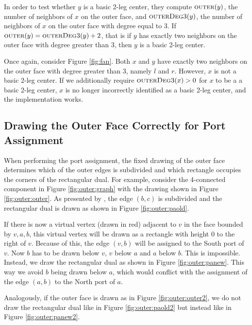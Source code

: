 \documentclass[a4paper]{article}
\begin{document}
In order to test whether $y$ is a basic 2-leg center, they compute
$\textsc{outer}(y)$, the number of neighbors of $x$ on the outer face, and
$\textsc{outerDeg3}(y)$, the number of neighbors of $x$ on the outer face with
degree equal to $3$.
If $\textsc{outer}(y) = \textsc{outerDeg3}(y) + 2$, that is if $y$ has exactly
two neighbors on the outer face with degree greater than $3$, then $y$ is a
basic 2-leg center.

Once again, consider Figure \ref{fig:fan}. Both $x$ and $y$ have exactly two
neighbors on the outer face with degree greater than 3, namely $l$ and $r$.
However, $x$ is not a basic 2-leg center.
If we additionally require $\textsc{outerDeg3}(x) > 0$ for $x$ to be a a basic
2-leg center, $x$ is no longer incorrectly identified as a basic 2-leg center,
and the implementation works.

\subsection{Drawing the Outer Face Correctly for Port Assignment}
When performing the port assignment, the fixed drawing of the outer face
determines which of the outer edges is subdivided and which rectangle occupies
the corners of the rectangular dual. For example, consider the 4-connected
component in Figure \ref{fig:outer:graph} with the drawing shown in Figure
\ref{fig:outer:outer}. As presented by \citet{ldrawing}, the edge $(b,c)$ is
subdivided and the rectangular dual is drawn as shown in Figure
\ref{fig:outer:paold}.

If there is now a virtual vertex (drawn in red) adjacent to $v$ in the face
bounded by $v,a,b$, this virtual vertex will be drawn as a rectangle with height
0 to the right of $v$.
Because of this, the edge $(v,b)$ will be assigned to the South port of $v$.
Now $b$ has to be drawn below $v$, $v$ below $a$ and $a$ below $b$.
This is impossible.
Instead, we draw the rectangular dual as shown in Figure \ref{fig:outer:panew}.
This way we avoid $b$ being drawn below $a$, which would conflict with the
assignment of the edge $(a,b)$ to the North port of $a$.

Analogously, if the outer face is drawn as in Figure \ref{fig:outer:outer2}, we
do not draw the rectangular dual like in Figure \ref{fig:outer:paold2} but
instead like in Figure \ref{fig:outer:panew2}.
\end{document}

